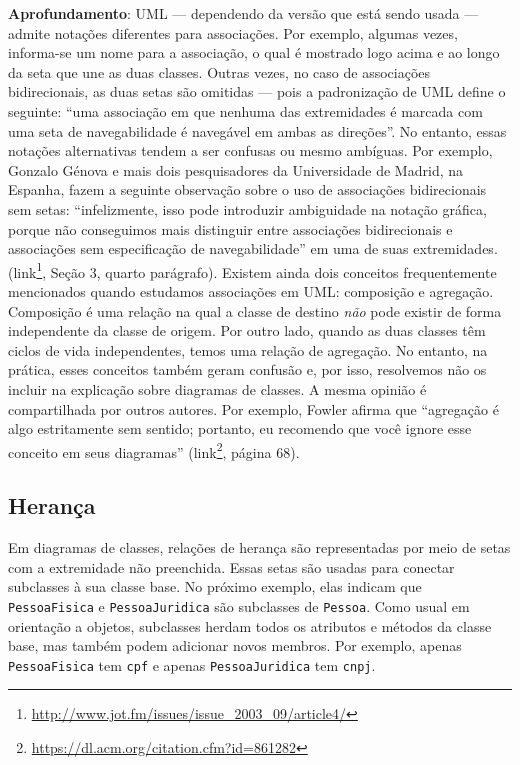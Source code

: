 \documentclass[
  11pt,
  twoside]{book}
\newcommand{\passthrough}[1]{#1}
\DeclareRobustCommand{\href}[2]{#2\footnote{\url{#1}}}
\newenvironment{esmbox}{\centering \vspace{1.5ex} \begin{tcolorbox}[breakable, colback=backcolor, width=4.9in]}{\end{tcolorbox} \vspace{1.5ex}}
\begin{document}
\begin{esmbox}

\textbf{Aprofundamento}: UML --- dependendo da versão que está sendo
usada --- admite notações diferentes para associações. Por exemplo,
algumas vezes, informa-se um nome para a associação, o qual é mostrado
logo acima e ao longo da seta que une as duas classes. Outras vezes, no
caso de associações bidirecionais, as duas setas são omitidas --- pois a
padronização de UML define o seguinte: ``uma associação em que nenhuma
das extremidades é marcada com uma seta de navegabilidade é navegável em
ambas as direções''. No entanto, essas notações alternativas tendem a
ser confusas ou mesmo ambíguas. Por exemplo, Gonzalo Génova e mais dois
pesquisadores da Universidade de Madrid, na Espanha, fazem a seguinte
observação sobre o uso de associações bidirecionais sem setas:
``infelizmente, isso pode introduzir ambiguidade na notação gráfica,
porque não conseguimos mais distinguir entre associações bidirecionais e
associações sem especificação de navegabilidade'' em uma de suas
extremidades.
(\href{http://www.jot.fm/issues/issue_2003_09/article4/}{link}, Seção 3,
quarto parágrafo). Existem ainda dois conceitos frequentemente
mencionados quando estudamos associações em UML: composição e agregação.
Composição é uma relação na qual a classe de destino \emph{não} pode
existir de forma independente da classe de origem. Por outro lado,
quando as duas classes têm ciclos de vida independentes, temos uma
relação de agregação. No entanto, na prática, esses conceitos também
geram confusão e, por isso, resolvemos não os incluir na explicação
sobre diagramas de classes. A mesma opinião é compartilhada por outros
autores. Por exemplo, Fowler afirma que ``agregação é algo estritamente
sem sentido; portanto, eu recomendo que você ignore esse conceito em
seus diagramas''
(\href{https://dl.acm.org/citation.cfm?id=861282}{link}, página 68).

\end{esmbox}

\hypertarget{heranuxe7a}{%
\subsection{Herança}\label{heranuxe7a}}


Em diagramas de classes, relações de herança são representadas por meio
de setas com a extremidade não preenchida. Essas setas são usadas para
conectar subclasses à sua classe base. No próximo exemplo, elas indicam
que \passthrough{\lstinline!PessoaFisica!} e
\passthrough{\lstinline!PessoaJuridica!} são subclasses de
\passthrough{\lstinline!Pessoa!}. Como usual em orientação a objetos,
subclasses herdam todos os atributos e métodos da classe base, mas
também podem adicionar novos membros. Por exemplo, apenas
\passthrough{\lstinline!PessoaFisica!} tem \passthrough{\lstinline!cpf!}
e apenas \passthrough{\lstinline!PessoaJuridica!} tem
\passthrough{\lstinline!cnpj!}.
\end{document}
